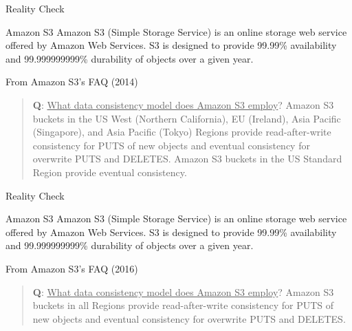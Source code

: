 \begin{frame}{Reality Check}

\begin{block}{Amazon S3}
Amazon S3 (Simple Storage Service) is an online storage web service offered by Amazon Web Services.
S3 is designed to provide   99.99\% availability and 99.999999999\% durability of objects over a given year.
\end{block}

\smallskip
\begin{block}{From Amazon S3's FAQ (2014)}
\begin{quote}
\textbf{Q}: \underline{What data consistency model does Amazon S3 employ}?
Amazon S3 buckets in the US West (Northern California), EU (Ireland), Asia
Pacific (Singapore), and Asia Pacific (Tokyo) Regions provide
\alert{read-after-write} consistency for PUTS of new objects and
\alert{eventual consistency} for overwrite PUTS and DELETES. Amazon S3 buckets
in the US Standard Region provide \alert{eventual
consistency}.
\end{quote}
\end{block}

\end{frame}

\begin{frame}{Reality Check}

\begin{block}{Amazon S3}
Amazon S3 (Simple Storage Service) is an online storage web service offered by Amazon Web Services.
S3 is designed to provide   99.99\% availability and 99.999999999\% durability of objects over a given year.
\end{block}

\smallskip
\begin{block}{From Amazon S3's FAQ (2016)}
\begin{quote}
\textbf{Q}: \underline{What data consistency model does Amazon S3 employ}?
Amazon S3 buckets in all Regions provide \alert{read-after-write consistency} for PUTS of new objects and \alert{eventual consistency} for overwrite PUTS and DELETES.
\end{quote}
\end{block}

\end{frame}




